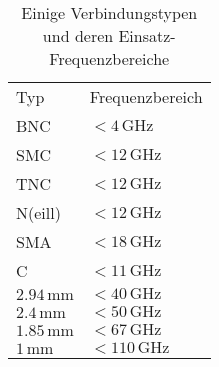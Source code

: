\begin{table}[H]
  \begin{center}
    \begin{tabular}{ll}
      \rowcolor{gray0}
      Typ                         & Frequenzbereich            \\
      BNC                         & $< 4\, \si{\giga\hertz}$   \\
      SMC                         & $< 12 \, \si{\giga\hertz}$ \\
      TNC                         & $< 12 \, \si{\giga\hertz}$ \\
      N(eill)                     & $< 12\, \si{\giga\hertz}$  \\
      SMA                         & $< 18 \, \si{\giga\hertz}$ \\
      C                           & $< 11 \, \si{\giga\hertz}$ \\
      $2.94 \, \si{\milli\meter}$ & $< 40 \, \si{\giga\hertz}$ \\
      $2.4 \, \si{\milli\meter}$  & $< 50\, \si{\giga\hertz}$  \\
      $1.85 \, \si{\milli\meter}$ & $< 67\, \si{\giga\hertz}$  \\
      $1 \, \si{\milli\meter}$    & $< 110\, \si{\giga\hertz}$
    \end{tabular}
\end{center}
\caption{Einige Verbindungstypen und deren Einsatz-Frequenzbereiche}
\end{table}